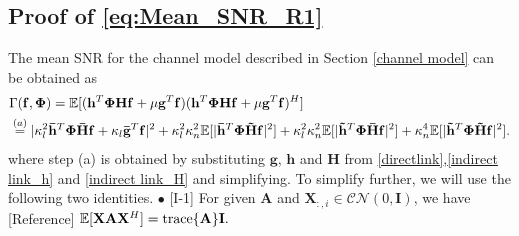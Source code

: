 \documentclass[journal,draftclsnofoot,onecolumn,12pt]{IEEEtran}
\begin{document}
\subsection{Proof of \eqref{eq:Mean_SNR_R1}}\label{AppA}\vspace{-.3cm}
The mean {\rm SNR} for the channel model described in Section \ref{channel model} can be obtained as
\begin{align}
    &\Gamma(\mathbf{f}, \mathbf{\Phi})
    = \mathbb{E}[(\mathbf{h}^T\mathbf{\Phi Hf} + \mu \mathbf{g}^T\mathbf{f})(\mathbf{h}^T\mathbf{\Phi Hf} + \mu \mathbf{g}^T\mathbf{f})^H]\nonumber\\
     &\stackrel{(a)}{=} |\kappa_l^2\mathbf{\Bar{h}}^T\mathbf{\Phi}\mathbf{\Bar{H}f} + \kappa_l\mathbf{\Bar{g}}^T\mathbf{f}|^2+ \kappa_l^2\kappa_n^2 \mathbb{E}[|\mathbf{\Bar{h}}^T\mathbf{\Phi}\mathbf{\Tilde{H}f}|^2] + \kappa_l^2\kappa_n^2\mathbb{E}[|\mathbf{\Tilde{h}}^T\mathbf{\Phi}\mathbf{\Bar{H}f}|^2] + \kappa_n^4\mathbb{E}[|\mathbf{\Tilde{h}}^T\mathbf{\Phi}\mathbf{\Tilde{H}f}|^2].\label{ESNR}  
\end{align}
where step (a) is obtained by substituting $\mathbf{g}$, $\mathbf{h}$ and $\mathbf{H}$ from \eqref{directlink},\eqref{indirect link_h} and \eqref{indirect link_H} and simplifying. 
To  simplify further, we will use the following two identities.
    \newline$\bullet$ [I-1] For given $\mathbf{A}$ and $\mathbf{X}_{:,i} \in \mathcal{CN}(0, \mathbf{I})$, we have [Reference]
            $\mathbb{E}[\mathbf{X A}\mathbf{X}^H] = \rm{trace}\{\mathbf{A}\}\mathbf{I}.$ 
\end{document}

